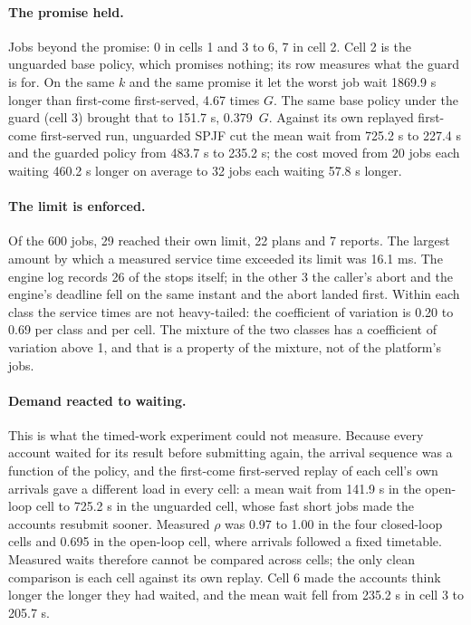 \documentclass[mathematics,supfile,submit,moreauthors]{Definitions/mdpi}
\newcommand{\devnum}[1]{#1}
\begin{document}
\paragraph{The promise held.} Jobs beyond the promise: \devnum{0} in cells 1 and 3 to
6, \devnum{7} in cell 2. Cell 2 is the unguarded base policy, which promises nothing;
its row measures what the guard is for. On the same $k$ and the same promise it let
the worst job wait \devnum{1869.9} s longer than first-come first-served,
\devnum{4.67} times $G$. The same base policy under the guard (cell 3) brought that to
\devnum{151.7} s, \devnum{0.379}~$G$. Against its own replayed first-come first-served
run, unguarded SPJF cut the mean wait from \devnum{725.2} s to \devnum{227.4} s and the
guarded policy from \devnum{483.7} s to \devnum{235.2} s; the cost moved from
\devnum{20} jobs each waiting \devnum{460.2} s longer on average to \devnum{32} jobs
each waiting \devnum{57.8} s longer.

\paragraph{The limit is enforced.} Of the \devnum{600} jobs, \devnum{29} reached their
own limit, \devnum{22} plans and \devnum{7} reports. The largest amount by which a
measured service time exceeded its limit was \devnum{16.1} ms. The engine log records
\devnum{26} of the stops itself; in the other \devnum{3} the caller's abort and the
engine's deadline fell on the same instant and the abort landed first. Within each
class the service times are not heavy-tailed: the coefficient of variation is
\devnum{0.20} to \devnum{0.69} per class and per cell. The mixture of the two classes
has a coefficient of variation above \devnum{1}, and that is a property of the mixture,
not of the platform's jobs.

\paragraph{Demand reacted to waiting.} This is what the timed-work experiment could
not measure. Because every account waited for its result before submitting again,
the arrival sequence was a function of the policy, and the first-come first-served
replay of each cell's own arrivals gave a different load in every cell: a mean wait
from \devnum{141.9} s in the open-loop cell to \devnum{725.2} s in the unguarded cell,
whose fast short jobs made the accounts resubmit sooner. Measured $\rho$ was
\devnum{0.97} to \devnum{1.00} in the four closed-loop cells and \devnum{0.695} in the
open-loop cell, where arrivals followed a fixed timetable. Measured waits therefore
cannot be compared across cells; the only clean comparison is each cell against its
own replay. Cell 6 made the accounts think longer the longer they had waited, and
the mean wait fell from \devnum{235.2} s in cell 3 to \devnum{205.7} s.
\end{document}
